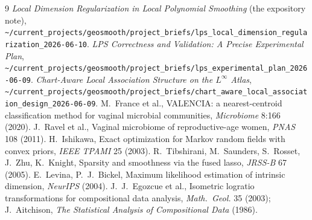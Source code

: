 \documentclass[11pt]{article}
\theoremstyle{definition}
\begin{document}
\begin{thebibliography}{9}\small
{} \emph{Local Dimension Regularization in Local Polynomial
  Smoothing} (the expository note),
  \nolinkurl{~/current_projects/geosmooth/project_briefs/lps_local_dimension_regularization_2026-06-10}.
 \emph{LPS Correctness and Validation: A Precise Experimental Plan},
  \nolinkurl{~/current_projects/geosmooth/project_briefs/lps_experimental_plan_2026-06-09}.
 \emph{Chart-Aware Local Association Structure on the
  $L^\infty$ Atlas},
  \nolinkurl{~/current_projects/geosmooth/project_briefs/chart_aware_local_association_design_2026-06-09}.
 M.~France et al., VALENCIA: a nearest-centroid classification
  method for vaginal microbial communities, \emph{Microbiome} 8:166 (2020).
 J.~Ravel et al., Vaginal microbiome of reproductive-age women,
  \emph{PNAS} 108 (2011).
 H.~Ishikawa, Exact optimization for Markov random fields with
  convex priors, \emph{IEEE TPAMI} 25 (2003).
 R.~Tibshirani, M.~Saunders, S.~Rosset, J.~Zhu, K.~Knight,
  Sparsity and smoothness via the fused lasso, \emph{JRSS-B} 67 (2005).
 E.~Levina, P.~J.~Bickel, Maximum likelihood estimation of
  intrinsic dimension, \emph{NeurIPS} (2004).
 J.~J.~Egozcue et al., Isometric logratio transformations for
  compositional data analysis, \emph{Math.\ Geol.} 35 (2003);
  J.~Aitchison, \emph{The Statistical Analysis of Compositional Data} (1986).
\end{thebibliography}
\end{document}
